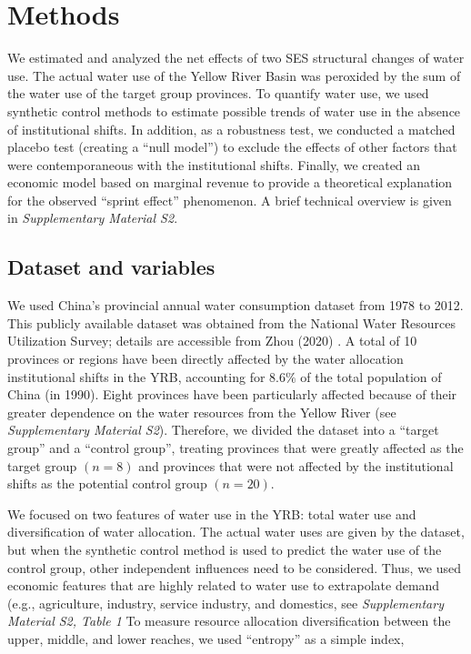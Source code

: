 \documentclass{../nsr}
\begin{document}
\section{Methods}
We estimated and analyzed the net effects of two SES structural changes of water use. The actual water use of the Yellow River Basin was peroxided by the sum of the water use of the target group provinces. To quantify water use, we used synthetic control methods to estimate possible trends of water use in the absence of institutional shifts. In addition, as a robustness test, we conducted a matched placebo test (creating a “null model”) to exclude the effects of other factors that were contemporaneous with the institutional shifts. Finally, we created an economic model based on marginal revenue to provide a theoretical explanation for the observed “sprint effect” phenomenon. A brief technical overview is given in \textit{Supplementary Material S2}.

\subsection{Dataset and variables}
We used China’s provincial annual water consumption dataset from 1978 to 2012. This publicly available dataset was obtained from the National Water Resources Utilization Survey; details are accessible from Zhou (2020)
\cite{zhouDecelerationChinahuman2020}.
A total of 10 provinces or regions have been directly affected by the water allocation institutional shifts in the YRB, accounting for $8.6\%$ of the total population of China (in 1990). Eight provinces have been particularly affected because of their greater dependence on the water resources from the Yellow River (see \textit{Supplementary Material S2}). Therefore, we divided the dataset into a “target group” and a “control group”, treating provinces that were greatly affected as the target group $(n=8)$ and provinces that were not affected by the institutional shifts as the potential control group $(n=20)$.

We focused on two features of water use in the YRB: total water use and diversification of water allocation. The actual water uses are given by the dataset, but when the synthetic control method is used to predict the water use of the control group, other independent influences need to be considered. Thus, we used economic features that are highly related to water use to extrapolate demand (e.g., agriculture, industry, service industry, and domestics, see \textit{Supplementary Material S2, Table 1} To measure resource allocation diversification between the upper, middle, and lower reaches, we used “entropy” as a simple index,
\end{document}
